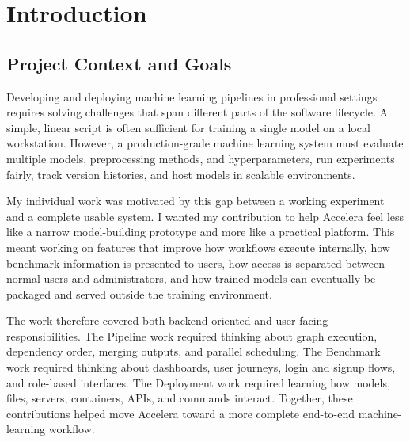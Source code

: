 \documentclass[12pt,a4paper,oneside]{report}
\newcommand{\systemname}{Accelera}
\begin{document}
\tableofcontents
\listoffigures
\listoftables
\clearpage

\chapter{Introduction}
\label{chap:introduction}

\section{Project Context and Goals}
Developing and deploying machine learning pipelines in professional settings requires solving challenges that span different parts of the software lifecycle. A simple, linear script is often sufficient for training a single model on a local workstation. However, a production-grade machine learning system must evaluate multiple models, preprocessing methods, and hyperparameters, run experiments fairly, track version histories, and host models in scalable environments.

My individual work was motivated by this gap between a working experiment and a complete usable system. I wanted my contribution to help \systemname{} feel less like a narrow model-building prototype and more like a practical platform. This meant working on features that improve how workflows execute internally, how benchmark information is presented to users, how access is separated between normal users and administrators, and how trained models can eventually be packaged and served outside the training environment.

The work therefore covered both backend-oriented and user-facing responsibilities. The Pipeline work required thinking about graph execution, dependency order, merging outputs, and parallel scheduling. The Benchmark work required thinking about dashboards, user journeys, login and signup flows, and role-based interfaces. The Deployment work required learning how models, files, servers, containers, APIs, and commands interact. Together, these contributions helped move \systemname{} toward a more complete end-to-end machine-learning workflow.
\end{document}
